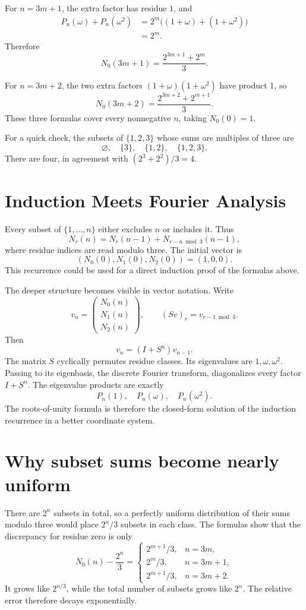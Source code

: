 For \(n=3m+1\), the extra factor has residue \(1\), and
\[
\begin{aligned}
 P_n(\omega)+P_n(\omega^2)
 &=2^m\bigl((1+\omega)+(1+\omega^2)\bigr)\\
 &=2^m.
\end{aligned}
\]
Therefore
\[
 \boxed{N_0(3m+1)=\frac{2^{3m+1}+2^m}{3}.}
\]

For \(n=3m+2\), the two extra factors \((1+\omega)(1+\omega^2)\) have product \(1\), so
\[
 \boxed{N_0(3m+2)=\frac{2^{3m+2}+2^{m+1}}3.}
\]
These three formulas cover every nonnegative \(n\), taking \(N_0(0)=1\).

For a quick check, the subsets of \(\{1,2,3\}\) whose sums are multiples of three are
\[
 \varnothing,\quad \{3\},\quad\{1,2\},\quad\{1,2,3\}.
\]
There are four, in agreement with \((2^3+2^2)/3=4\).

\section{Induction Meets Fourier Analysis}

Every subset of \(\{1,\ldots,n\}\) either excludes \(n\) or includes it. Thus
\[
 \boxed{N_r(n)=N_r(n-1)+N_{r-n\bmod3}(n-1),}
\]
where residue indices are read modulo three. The initial vector is
\[
 (N_0(0),N_1(0),N_2(0))=(1,0,0).
\]
This recurrence could be used for a direct induction proof of the formulas above.

The deeper structure becomes visible in vector notation. Write
\[
 v_n=\begin{pmatrix}N_0(n)\\N_1(n)\\N_2(n)\end{pmatrix},
 \qquad
 (Sv)_r=v_{r-1\bmod3}.
\]
Then
\[
 \boxed{v_n=(I+S^n)v_{n-1}.}
\]
The matrix \(S\) cyclically permutes residue classes. Its eigenvalues are \(1,\omega,\omega^2\). Passing to its eigenbasis, the discrete Fourier transform, diagonalizes every factor \(I+S^n\). The eigenvalue products are exactly
\[
 P_n(1),\quad P_n(\omega),\quad P_n(\omega^2).
\]
The roots-of-unity formula is therefore the closed-form solution of the induction recurrence in a better coordinate system.

\section{Why subset sums become nearly uniform}

There are \(2^n\) subsets in total, so a perfectly uniform distribution of their sums modulo three would place \(2^n/3\) subsets in each class. The formulas show that the discrepancy for residue zero is only
\[
 N_0(n)-\frac{2^n}{3}
 =
 \begin{cases}
 2^{m+1}/3,&n=3m,\\
 2^m/3,&n=3m+1,\\
 2^{m+1}/3,&n=3m+2.
 \end{cases}
\]
It grows like \(2^{n/3}\), while the total number of subsets grows like \(2^n\). The relative error therefore decays exponentially.

